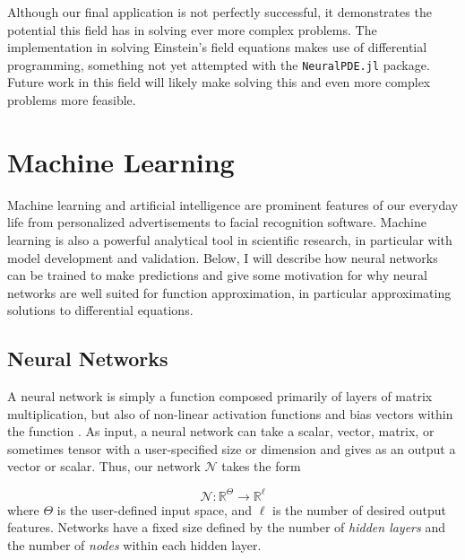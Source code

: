 \documentclass{CUP-JNL-DTM}%
\theoremstyle{definition}
\numberwithin{equation}{section}
\newcommand{\net}{\mathcal{N}}
\newcommand{\Define}{\emph}
\begin{document}
Although our final application is not perfectly successful, it demonstrates the potential this field has in solving ever more complex problems. The implementation in solving Einstein's field equations makes use of differential programming, something not yet attempted with the \texttt{NeuralPDE.jl} package. Future work in this field will likely make solving this and even more complex problems more feasible. 



\section{Machine Learning}
\label{sec:ML}

Machine learning and artificial intelligence are prominent features of our everyday life from personalized advertisements to facial recognition software. Machine learning is also a powerful analytical tool in scientific research, in particular with model development and validation. Below, I will describe how neural networks can be trained to make predictions and give some motivation for why neural networks are well suited for function approximation, in particular approximating solutions to differential equations. 


\subsection{Neural Networks}

A neural network is simply a function composed primarily of layers of matrix multiplication, but also of non-linear activation functions and bias vectors within the function \cite{strangLinearAlgebraLearning2019, bishopPatternRecognitionMachine2006}. As input, a neural network can take a scalar, vector, matrix, or sometimes tensor with a user-specified size or dimension and gives as an output a vector or scalar. Thus, our network $\net$ takes the form

\begin{equation}
    \net : \mathbb{R}^{\Theta} \rightarrow \mathbb{R}^{\ell}
\end{equation}
where $\Theta$ is the user-defined input space, and $\ell$ is the number of desired output features. Networks have a fixed size defined by the number of \Define{hidden layers} and the number of \Define{nodes} within each hidden layer. 
\end{document}
